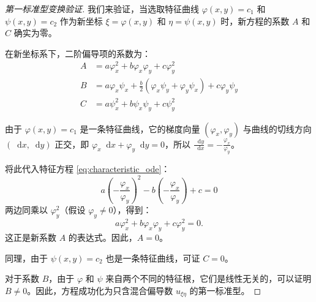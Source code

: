 \documentclass[12pt,a4paper]{article}
\newcommand{\diff}{\mathop{}\!\mathrm{d}}
\numberwithin{subsection}{section}   %
\numberwithin{subsubsection}{subsection}
\theoremstyle{plain}
\theoremstyle{definition}
\theoremstyle{remark}
\theoremstyle{remark}
\begin{document}
	\begin{proof}[第一标准型变换验证]
		我们来验证，当选取特征曲线 \(\varphi(x,y)=c_1\) 和 \(\psi(x,y)=c_2\) 作为新坐标 \(\xi=\varphi(x,y)\) 和 \(\eta=\psi(x,y)\) 时，新方程的系数 \(A\) 和 \(C\) 确实为零。
		
		在新坐标系下，二阶偏导项的系数为：
		\begin{align*}
			A &= a\varphi_x^2 + b\varphi_x\varphi_y + c\varphi_y^2 \\
			B &= a\varphi_x\psi_x + \frac{b}{2}(\varphi_x\psi_y + \varphi_y\psi_x) + c\varphi_y\psi_y \\
			C &= a\psi_x^2 + b\psi_x\psi_y + c\psi_y^2
		\end{align*}
		
		由于 \(\varphi(x,y)=c_1\) 是一条特征曲线，它的梯度向量 \((\varphi_x, \varphi_y)\) 与曲线的切线方向 \((\diff x, \diff y)\) 正交，即 \(\varphi_x \diff x + \varphi_y \diff y = 0\)，所以 \(\frac{\diff y}{\diff x} = -\frac{\varphi_x}{\varphi_y}\)。
		
		将此代入特征方程 \eqref{eq:characteristic_ode}：
		\[
		a \left(-\frac{\varphi_x}{\varphi_y}\right)^2 - b \left(-\frac{\varphi_x}{\varphi_y}\right) + c = 0
		\]
		两边同乘以 \(\varphi_y^2\)（假设 \(\varphi_y \neq 0\)），得到：
		\[
		a\varphi_x^2 + b\varphi_x\varphi_y + c\varphi_y^2 = 0.
		\]
		这正是新系数 \(A\) 的表达式。因此，\(A=0\)。
		
		同理，由于 \(\psi(x,y)=c_2\) 也是一条特征曲线，可证 \(C=0\)。
		
		对于系数 \(B\)，由于 \(\varphi\) 和 \(\psi\) 来自两个不同的特征根，它们是线性无关的，可以证明 \(B \neq 0\)。因此，方程成功化为只含混合偏导数 \(u_{\xi\eta}\) 的第一标准型。
	\end{proof}
	
\end{document}
